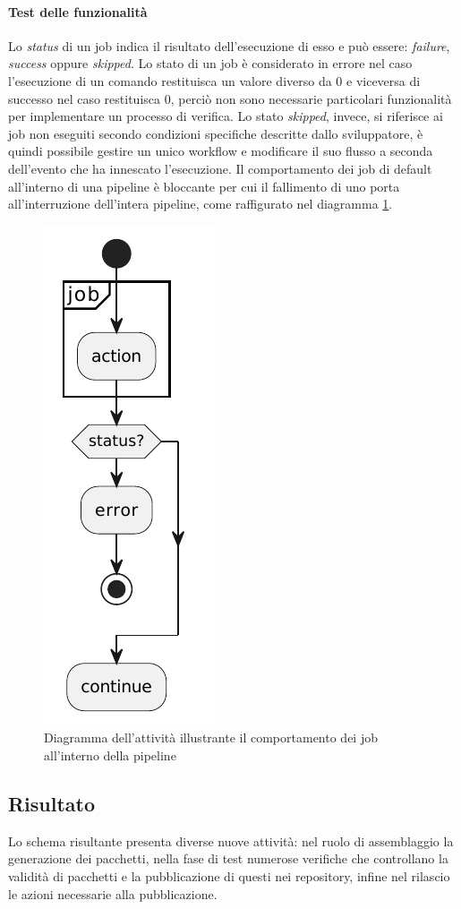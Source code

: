 \paragraph{Test delle funzionalità} Lo \textit{status} di un job indica il risultato dell'esecuzione di esso e può essere: \textit{failure}, \textit{success} oppure \textit{skipped}. Lo stato di un job è considerato in errore nel caso l'esecuzione di un comando restituisca un valore diverso da 0 e viceversa di successo nel caso restituisca 0, perciò non sono necessarie particolari funzionalità per implementare un processo di verifica. Lo stato \textit{skipped}, invece, si riferisce ai job non eseguiti secondo condizioni specifiche descritte dallo sviluppatore, è quindi possibile gestire un unico workflow e modificare il suo flusso a seconda dell'evento che ha innescato l'esecuzione. Il comportamento dei job di default all'interno di una pipeline è bloccante per cui il fallimento di uno porta all'interruzione dell'intera pipeline, come raffigurato nel diagramma \ref{fig:activity-diagram-job}.
\begin{figure}[htb]
	\centering
	\includegraphics[width=.18\linewidth]{figures/activity-diagram-job.pdf}
	\caption{Diagramma dell'attività illustrante il comportamento dei job all'interno della pipeline}
	\label{fig:activity-diagram-job}
\end{figure}

\subsection{Risultato}

Lo schema risultante presenta diverse nuove attività: nel ruolo di assemblaggio la generazione dei pacchetti, nella fase di test numerose verifiche che controllano la validità di pacchetti e la pubblicazione di questi nei repository, infine nel rilascio le azioni necessarie alla pubblicazione.


